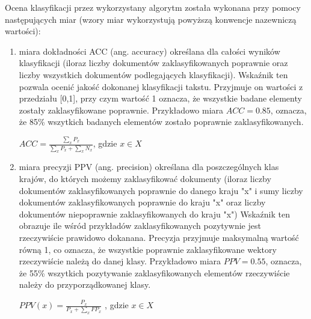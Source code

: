 \documentclass{classrep}
\begin{document}
Ocena klasyfikacji przez wykorzystany algorytm została wykonana przy pomocy następujących miar \cite{tablicapomylek} (wzory miar wykorzystują powyższą konwencje nazewniczą wartości):\\
\begin{enumerate}
\item miara dokładności ACC (ang. accuracy) określana dla całości wyników klasyfikacji (iloraz liczby dokumentów zaklasyfikowanych poprawnie oraz liczby wszystkich dokumentów podlegających klasyfikacji).
Wskaźnik ten pozwala ocenić jakość dokonanej klasyfikacji takstu. Przyjmuje on wartości z przedziału [0,1], przy czym wartość 1 oznacza, że wszystkie badane elementy zostały zaklasyfikowane poprawnie.
Przykładowo miara $ACC =  0.85$, oznacza, że 85\% wszytkich badanych elementów zostało poprawnie zaklasyfikowanych. \\
\begin{center}
    $ACC = \frac{\sum_{x} P_x }{\sum_{x} P_x+ \sum_{x}  N_x}$, gdzie $x\in X$
\end{center} \hfill \break



\item miara precyzji PPV (ang. precision) określana dla poszczególnych klas krajów, do których możemy zaklasyfikować dokumenty (iloraz liczby dokumentów zaklasyfikowanych poprawnie do danego kraju "x" i sumy liczby dokumentów zaklasyfikowanych poprawnie do kraju "x" oraz liczby dokumentów niepoprawnie zaklasyfikowanych do kraju "x")
Wskaźnik ten obrazuje ile wśród przykładów zaklasyfikowanych pozytywnie jest rzeczywiście prawidowo dokanana. Precyzja przyjmuje maksymalną wartość równą 1, co oznacza, że wszystkie poprawnie zaklasyfikowane wektory rzeczywiście należą do danej klasy. 
Przykładowo miara $PPV =  0.55$, oznacza, że 55\% wszytkich pozytywanie zaklasyfikowanych elementów rzeczywiście należy do przyporządkowanej klasy. \\
\begin{center}
      $PPV(x) = \frac{P_x}{ P_x + \sum_{x}  FP_x}$ , gdzie $x\in X$\\
\end{center} \hfill \break


\end{enumerate}
\end{document}
